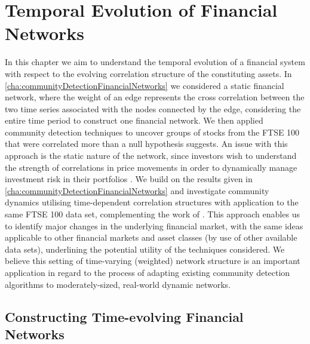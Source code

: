 
\chapter{Temporal Evolution of Financial Networks}

\label{cha:temporalEvolutionFinancialNetworks}


In this chapter we aim to understand the temporal evolution of a financial system with respect to the evolving correlation structure of the constituting assets.
In \cref{cha:communityDetectionFinancialNetworks} we considered a static financial network, where the weight of an edge represents the cross correlation between the two time series associated with the nodes connected by the edge, considering the entire time period to construct one financial network.
We then applied community detection techniques to uncover groups of stocks from the FTSE 100 that were correlated more than a null hypothesis suggests.
An issue with this approach is the static nature of the network, since investors wish to understand the strength of correlations in price movements in order to dynamically manage investment risk in their portfolios \cite{FPW+11}.
We build on the results given in \cref{cha:communityDetectionFinancialNetworks} and investigate community dynamics utilising time-dependent correlation structures with application to the same FTSE 100 data set, complementing the work of \cite{OCK+02,OKK03,BD10,FPM+10,FPW+11}.
This approach enables us to identify major changes in the underlying financial market, with the same ideas applicable to other financial markets and asset classes (by use of other available data sets), underlining the potential utility of the techniques considered.
We believe this setting of time-varying (weighted) network structure is an important application in regard to the process of adapting existing community detection algorithms to moderately-sized, real-world dynamic networks.


\section{Constructing Time-evolving Financial Networks}
\label{sec:timeEvolvingFinancialNetwork}

